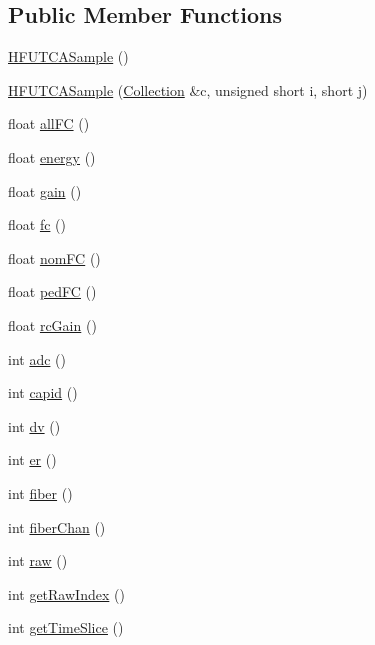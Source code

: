 \subsection*{Public Member Functions}
\begin{DoxyCompactItemize}
\item 
\hyperlink{class_h_f_u_t_c_a_sample_a6372aa87747642e805bb705c5053b308}{H\+F\+U\+T\+C\+A\+Sample} ()
\item 
\hyperlink{class_h_f_u_t_c_a_sample_aa69d36db97b93bef64db908f0a9de2d1}{H\+F\+U\+T\+C\+A\+Sample} (\hyperlink{class_collection}{Collection} \&c, unsigned short i, short j)
\item 
float \hyperlink{class_h_f_u_t_c_a_sample_aca1a7db39701544c65d02b5b643a8752}{all\+F\+C} ()
\item 
float \hyperlink{class_h_f_u_t_c_a_sample_abd8d7c0f338668db3d18a2a79493e1ec}{energy} ()
\item 
float \hyperlink{class_h_f_u_t_c_a_sample_abda1fe3f4fd86f464fa1101469fda074}{gain} ()
\item 
float \hyperlink{class_h_f_u_t_c_a_sample_a41761d51c05dfbdf0c5da9be026dd773}{fc} ()
\item 
float \hyperlink{class_h_f_u_t_c_a_sample_a989c287e356b37be8886e93865d7a16a}{nom\+F\+C} ()
\item 
float \hyperlink{class_h_f_u_t_c_a_sample_a2bf5628c13f9908c0dc6606f2b8580c5}{ped\+F\+C} ()
\item 
float \hyperlink{class_h_f_u_t_c_a_sample_a0052d9a14ddb41b55e1e5e1983fc9684}{rc\+Gain} ()
\item 
int \hyperlink{class_h_f_u_t_c_a_sample_a6923b32caebe543bcc220c0079aaaede}{adc} ()
\item 
int \hyperlink{class_h_f_u_t_c_a_sample_ac7f68c45087e2c9d457515af56c8febc}{capid} ()
\item 
int \hyperlink{class_h_f_u_t_c_a_sample_a95f366e87ccd669a0fdb69363c71aefb}{dv} ()
\item 
int \hyperlink{class_h_f_u_t_c_a_sample_a26ede18ebc816eb8f5de7f1073566f7f}{er} ()
\item 
int \hyperlink{class_h_f_u_t_c_a_sample_aa9987206c078a46d3a41f5327c3bd83c}{fiber} ()
\item 
int \hyperlink{class_h_f_u_t_c_a_sample_acab9631919ea67506b229f7ac80a975f}{fiber\+Chan} ()
\item 
int \hyperlink{class_h_f_u_t_c_a_sample_a8aba41a05a990528d3bd3dada9e2fc91}{raw} ()
\item 
int \hyperlink{class_h_f_u_t_c_a_sample_ab9dcc1e0fa7372a4103385533267fbc5}{get\+Raw\+Index} ()
\item 
int \hyperlink{class_h_f_u_t_c_a_sample_a89c45d34d269cea4bfcfb9fb2e584151}{get\+Time\+Slice} ()
\end{DoxyCompactItemize}
